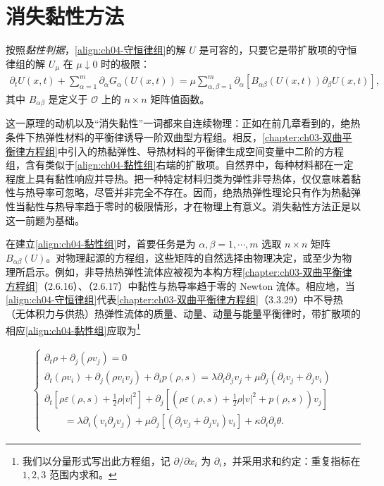 \documentclass[../../main.tex]{subfiles}
\begin{document}
\section{消失黏性方法}\label{section:ch04-消失黏性方法}

按照\emph{黏性判据}，\eqref{align:ch04-守恒律组}的解 $U$ 是可容的，只要它是带扩散项的守恒律组的解 $U_{\mu}$ 在 $\mu\downarrow 0$ 时的极限：
\begin{align}
\partial_{t}U(x,t)+\sum_{\alpha=1}^{m}\partial_{\alpha}G_{\alpha}(U(x,t))=\mu\sum_{\alpha,\beta=1}^{m}\partial_{\alpha}[B_{\alpha\beta}(U(x,t))\partial_{\beta}U(x,t)],
\label{align:ch04-黏性组}
\end{align}
其中 $B_{\alpha\beta}$ 是定义于 $\mathcal{O}$ 上的 $n\times n$ 矩阵值函数。

这一原理的动机以及“消失黏性”一词都来自连续物理：正如在前几章看到的，绝热条件下热弹性材料的平衡律诱导一阶双曲型方程组。相反，\cref{chapter:ch03-双曲平衡律方程组}中引入的热黏弹性、导热材料的平衡律生成空间变量中二阶的方程组，含有类似于\eqref{align:ch04-黏性组}右端的扩散项。自然界中，每种材料都在一定程度上具有黏性响应并导热。把一种特定材料归类为弹性非导热体，仅仅意味着黏性与热导率可忽略，尽管并非完全不存在。因而，绝热热弹性理论只有作为热黏弹性当黏性与热导率趋于零时的极限情形，才在物理上有意义。消失黏性方法正是以这一前题为基础。


在建立\eqref{align:ch04-黏性组}时，首要任务是为 $\alpha,\beta=1,\cdots,m$ 选取 $n\times n$ 矩阵 $B_{\alpha\beta}(U)$。对物理起源的方程组，这些矩阵的自然选择由物理决定，或至少为物理所启示。例如，非导热热弹性流体应被视为本构方程\cref{chapter:ch03-双曲平衡律方程组}（2.6.16）、（2.6.17）中黏性与热导率趋于零的 Newton 流体。相应地，当\eqref{align:ch04-守恒律组}代表\cref{chapter:ch03-双曲平衡律方程组}（3.3.29）中不导热（无体积力与供热）热弹性流体的质量、动量、动量与能量平衡律时，带扩散项的相应\eqref{align:ch04-黏性组}应取为\footnote{我们以分量形式写出此方程组，记 $\partial/\partial x_{i}$ 为 $\partial_{i}$，并采用求和约定：重复指标在 $1,2,3$ 范围内求和。}

\begin{align}
\begin{cases}
\partial_{t}\rho+\partial_{j}(\rho v_{j})=0\\
\partial_{t}(\rho v_{i})+\partial_{j}(\rho v_{i}v_{j})+\partial_{i}p(\rho,s)=\lambda\partial_{i}\partial_{j}v_{j}+\mu\partial_{j}(\partial_{i}v_{j}+\partial_{j}v_{i})\\
\partial_{t}\left[\rho\varepsilon(\rho,s)+\tfrac{1}{2}\rho|v|^{2}\right]+\partial_{j}\left[\left(\rho\varepsilon(\rho,s)+\tfrac{1}{2}\rho|v|^{2}+p(\rho,s)\right)v_{j}\right]\\
\qquad=\lambda\partial_{i}(v_{i}\partial_{j}v_{j})+\mu\partial_{j}\left[(\partial_{i}v_{j}+\partial_{j}v_{i})v_{i}\right]+\kappa\partial_{i}\partial_{i}\theta.
\end{cases}
\label{align:ch04-NS}
\end{align}
\end{document}
